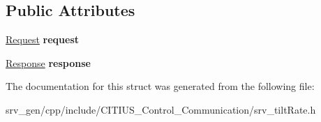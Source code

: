 \subsection*{\-Public \-Attributes}
\begin{DoxyCompactItemize}
\item 
\hypertarget{struct_c_i_t_i_u_s___control___communication_1_1srv__tilt_rate_ac84d0af5323507465b5220afb1bb9e81}{\hyperlink{struct_c_i_t_i_u_s___control___communication_1_1srv__tilt_rate_request__}{\-Request} {\bfseries request}}\label{struct_c_i_t_i_u_s___control___communication_1_1srv__tilt_rate_ac84d0af5323507465b5220afb1bb9e81}

\item 
\hypertarget{struct_c_i_t_i_u_s___control___communication_1_1srv__tilt_rate_adb2eaeb7d3ef51939c6f2d65e32a9542}{\hyperlink{struct_c_i_t_i_u_s___control___communication_1_1srv__tilt_rate_response__}{\-Response} {\bfseries response}}\label{struct_c_i_t_i_u_s___control___communication_1_1srv__tilt_rate_adb2eaeb7d3ef51939c6f2d65e32a9542}

\end{DoxyCompactItemize}


\-The documentation for this struct was generated from the following file\-:\begin{DoxyCompactItemize}
\item 
srv\-\_\-gen/cpp/include/\-C\-I\-T\-I\-U\-S\-\_\-\-Control\-\_\-\-Communication/srv\-\_\-tilt\-Rate.\-h\end{DoxyCompactItemize}
